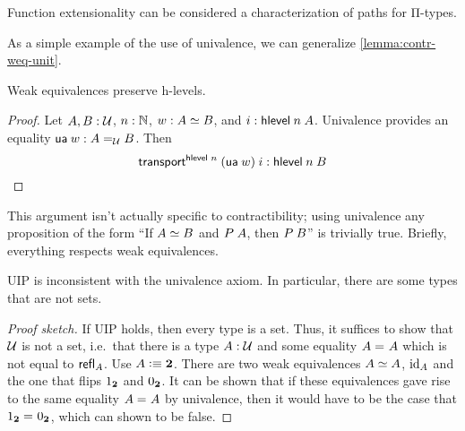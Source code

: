 \documentclass[./thesis.tex]{subfiles}
\begin{document}
Function extensionality can be considered a characterization of paths for Π-types.

As a simple example of the use of univalence, we can generalize
\cref{lemma:contr-weq-unit}.

\begin{theorem}
	Weak equivalences preserve h-levels.
\end{theorem}
\begin{proof}
  Let $A,B:\mathcal{U}$, $n:\mathbb{N}$, $w:A \simeq B$, and $i:\mathsf{hlevel}\hspace{0.25em} n \hspace{0.25em} A$.
	Univalence provides an equality $\mathsf{ua}\hspace{0.25em} w:A =_{\mathcal{U}} B$. 
  Then
  \begin{equation*}
    \mathsf{transport}^{\mathsf{hlevel}\hspace{0.25em} n}\hspace{0.25em} (\mathsf{ua}\hspace{0.25em} w) \hspace{0.25em} i : \mathsf{hlevel}\hspace{0.25em} n \hspace{0.25em} B
  \end{equation*}
\end{proof}

This argument isn't actually specific to contractibility; using univalence any
proposition of the form ``If $A \simeq B$ and $P\hspace{0.25em} A$, then $P\hspace{0.25em} B$''
is trivially true. Briefly, everything respects weak equivalences.

\begin{theorem}
	UIP is inconsistent with the univalence axiom. In particular, there are some
  types that are not sets.
\end{theorem}
\begin{proof}[Proof sketch]
  If UIP holds, then every type is a set. Thus, it suffices to show that $\mathcal{U}$
  is not a set, i.e.\ that there is a type $A:\mathcal{U}$ and some equality
  $A =_{} A$ which is not equal to $\mathsf{refl}_{A}$. Use $A\vcentcolon\equiv\mathbf{2}$.
  There are two weak equivalences $A \simeq A$, $\operatorname{id}_A$ and the one that flips
  $1_{\mathbf{2}}$ and $0_{\mathbf{2}}$. It can be shown that if these equivalences gave rise
  to the same equality $A =_{} A$ by univalence, then it would have to be
  the case that $1_{\mathbf{2}} =_{} 0_{\mathbf{2}}$, which can shown to be false.
\end{proof}
\end{document}

